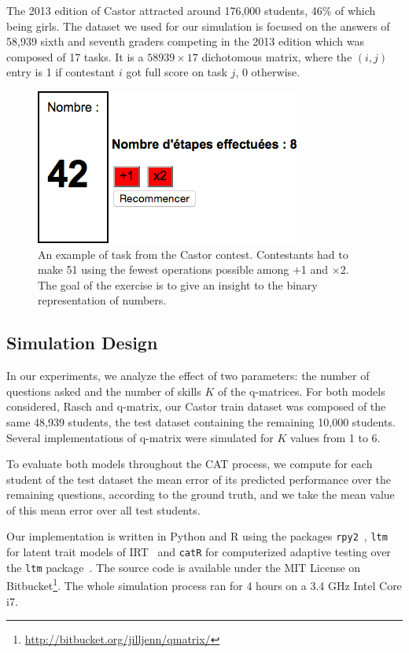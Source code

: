 \documentclass{edm_template}
\begin{document}
The 2013 edition of Castor attracted around 176,000 students, 46\% of which being girls. The dataset we used for our simulation is focused on the answers of 58,939 sixth and seventh graders competing in the 2013 edition which was composed of 17 tasks. It is a $58939 \times 17$ dichotomous matrix, where the $(i, j)$ entry is 1 if contestant $i$ got full score on task $j$, 0 otherwise.

\begin{figure}
\includegraphics[width=\linewidth]{51-calc}
\caption{An example of task from the Castor contest. Contestants had to make 51 using the fewest operations possible among $+$1 and $\times$2. The goal of the exercise is to give an insight to the binary representation of numbers.}
\label{fig:51}
\end{figure}

\subsection{Simulation Design}

In our experiments, we analyze the effect of two parameters: the number of questions asked and the number of skills $K$ of the q-matrices. For both models considered, Rasch and q-matrix, our Castor train dataset was composed of the same 48,939 students, the test dataset containing the remaining 10,000 students. Several implementations of q-matrix were simulated for $K$ values from 1 to 6.

To evaluate both models throughout the CAT process, we compute for each student of the test dataset the mean error of its predicted performance over the remaining questions, according to the ground truth, and we take the mean value of this mean error over all test students.

Our implementation is written in Python and R using the packages \texttt{rpy2}~\cite{Gautier2008}, \texttt{ltm} for latent trait models of IRT~\cite{Rizopoulos2006} and \texttt{catR} for computerized adaptive testing over the \texttt{ltm} package~\cite{MagisRaiche2012}. The source code is available under the MIT License on Bitbucket\footnote{\url{http://bitbucket.org/jilljenn/qmatrix/}}. The whole simulation process ran for 4 hours on a 3.4 GHz Intel Core i7.
\end{document}

